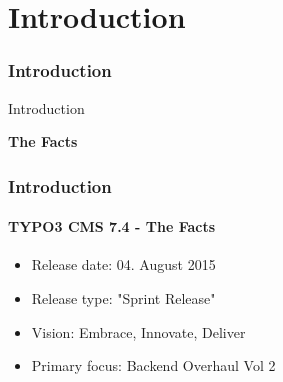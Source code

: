 %

\section{Introduction}
\begin{frame}[fragile]
	\frametitle{Introduction}

	\begin{center}\huge{Introduction}\end{center}
	\begin{center}\huge{\color{typo3darkgrey}\textbf{The Facts}}\end{center}

\end{frame}

\begin{frame}[fragile]
	\frametitle{Introduction}
	\framesubtitle{TYPO3 CMS 7.4 - The Facts}

	\begin{itemize}
		\item Release date: 04. August 2015
		\item Release type: "Sprint Release"
		\item Vision: Embrace, Innovate, Deliver
		\item Primary focus: Backend Overhaul Vol 2
	\end{itemize}

\end{frame}

